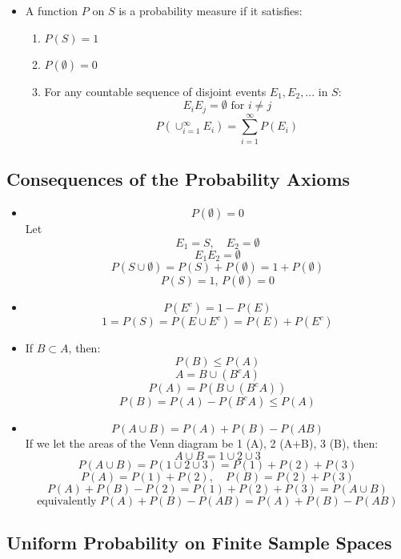 \begin{itemize}
    \item A function $P$ on $S$ is a probability measure if it satisfies:
          \begin{enumerate}
              \item $P(S) = 1$
              \item $P(\emptyset) = 0$
              \item For any countable sequence of disjoint events $E_1, E_2, ...$ in $S$:
                    \[ E_i E_j = \emptyset \text{ for } i \neq j \]
                    \[ P\left( \cup_{i=1}^{\infty} E_i \right) = \sum_{i=1}^{\infty} P(E_i) \]
          \end{enumerate}
\end{itemize}

\subsection{Consequences of the Probability Axioms}

\begin{itemize}
    \item \[ P(\emptyset) = 0 \]
          Let \[ E_1 = S, \quad E_2 = \emptyset \]
          \[ E_1 E_2 = \emptyset \]
          \[ P(S\cup \emptyset) = P(S) + P(\emptyset) = 1 + P(\emptyset) \]
          \[ P(S) = 1 , \, P(\emptyset) = 0 \]

    \item \[ P(E^c) = 1 - P(E) \]
          \[ 1 = P(S) = P(E\cup E^c ) = P(E) + P(E^c) \]

    \item If $B \subset A$, then:
          \[ P(B) \leq P(A) \]
          \[ A = B \cup (B^c A) \]
          \[ P(A) = P(B \cup (B^c A)) \]
          \[ P(B) = P(A) - P(B^c A) \leq P(A) \]

    \item \[ P(A \cup B) = P(A) + P(B) - P(AB) \]
          If we let the areas of the Venn diagram be 1 (A), 2 (A+B), 3 (B), then:
          \[ A \cup B = 1 \cup 2 \cup 3 \]
          \[ P(A\cup B) = P(1 \cup 2 \cup 3) = P(1) + P(2) + P(3) \]
          \[ P(A) = P(1) + P(2), \quad P(B) = P(2) + P(3) \]
          \[ P(A) + P(B) - P(2)  = P(1) + P(2) + P(3) = P(A \cup B) \]
          \[ \text{equivalently } P(A) + P(B) - P(AB) = P(A) + P(B) - P(AB) \]
\end{itemize}

\subsection{Uniform Probability on Finite Sample Spaces}

